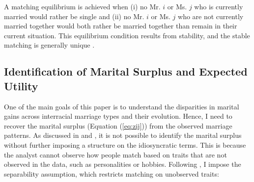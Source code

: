 


 A matching equilibrium is achieved when (i) no Mr. $i$ or Ms. $j$ who is currently married would rather be single and (ii) no Mr. $i$ or Ms. $j$ who are not currently married together would both rather be married together than remain in their current situation. This equilibrium condition results from stability, and the stable matching is generally unique  \citep{GaleShapley_1962_StabilityofMarriage, ShapleyShubik_1971_AssignmentGameI}. 



 
 \subsection{Identification of Marital Surplus and Expected Utility}
 
 
 One of the main goals of this paper is to understand the disparities in marital gains across interracial marriage types and their evolution. Hence, I need to recover the marital surplus (Equation (\ref{eq:zij})) from the observed marriage patterns. As discussed in \cite{ChooSiow_2006_WhoMarriesWhomandWhy} and \cite{ChiapporiSalanie_2016_EconometricsMatching}, it is not possible to identify the marital surplus without further imposing a structure on the idiosyncratic terms. This is because the analyst cannot observe how people match based on traits that are not observed in the data, such as personalities or hobbies. Following \cite{ChooSiow_2006_WhoMarriesWhomandWhy}, I impose the separability assumption, which restricts matching on unobserved traits:
 
